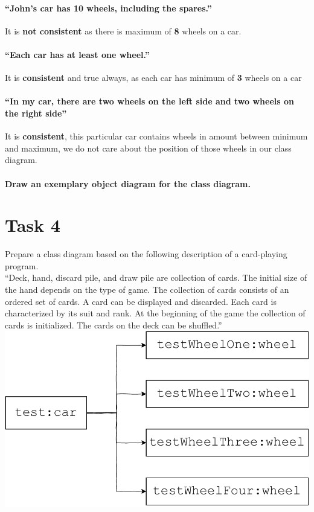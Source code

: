 \documentclass[12pt]{article}
\begin{document}
\paragraph{“John’s car has 10 wheels, including the spares.” }
It is \textbf{not consistent} as there is maximum of \textbf{8} wheels on a car.
\paragraph{“Each car has at least one wheel.” }
It is \textbf{consistent} and true always, as each car has minimum of \textbf{3} wheels on a car
\paragraph{“In my car, there are two wheels on the left side and two wheels on the right side”  } 
It is \textbf{consistent}, this particular car contains wheels in amount between minimum and maximum, we do not care about the position of those wheels in our class diagram.

\paragraph{Draw an exemplary object diagram for the class diagram. }
\section{Task 4}
Prepare a class diagram based on the following description of a card-playing program. 
\\
“Deck, hand, discard pile, and draw pile are collection of cards. The initial size of the hand depends on the type of game. The collection of cards consists of an ordered set of cards. A card can be displayed and discarded. Each card is characterized by its suit and rank. At the beginning of the game the collection of cards is initialized. The cards on the deck can be shuffled.” 
\\
\includegraphics[width=\textwidth]{4}
\end{document}

